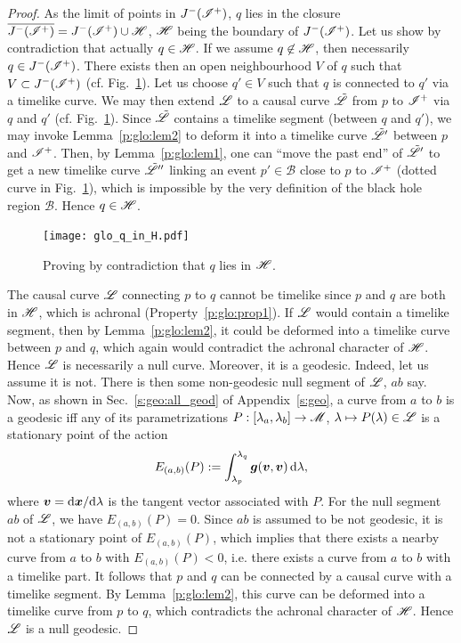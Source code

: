 \begin{proof}
As the limit of points in $J^-(\mathscr{I}^+)$, $q$ lies in the closure
$\overline{J^-(\mathscr{I}^+)} = J^-(\mathscr{I}^+) \cup \mathscr{H}$, $\mathscr{H}$
being the boundary of $J^-(\mathscr{I}^+)$.
Let us show by contradiction that actually $q\in\mathscr{H}$.
If we assume $q\not\in\mathscr{H}$, then necessarily $q\in J^-(\mathscr{I}^+)$.
There exists then an open neighbourhood $V$ of $q$ such that $V \subset  J^-(\mathscr{I}^+)$
(cf. Fig.~\ref{f:glo:q_in_H}).
Let us choose $q'\in V$ such that $q$ is connected to $q'$ via a timelike curve.
We may then extend $\mathscr{L}$ to a causal curve $\tilde{\mathscr{L}}$ from $p$ to $\mathscr{I}^+$
via $q$ and $q'$ (cf. Fig.~\ref{f:glo:q_in_H}). Since $\tilde{\mathscr{L}}$ contains a timelike segment
(between $q$ and $q'$), we may invoke Lemma~\ref{p:glo:lem2} to deform it into
a timelike curve $\tilde{\mathscr{L}}'$ between $p$ and $\mathscr{I}^+$. Then, by Lemma~\ref{p:glo:lem1},
one can ``move the past end'' of $\tilde{\mathscr{L}}'$
to get a new timelike curve $\tilde{\mathscr{L}}''$ linking an event $p'\in\mathscr{B}$ close
to $p$ to $\mathscr{I}^+$ (dotted curve in Fig.~\ref{f:glo:q_in_H}), which is impossible by the very definition of the black hole
region $\mathscr{B}$. Hence $q\in\mathscr{H}$.

\begin{figure}
\centerline{\texttt{[image: glo\_q\_in\_H.pdf]}}
\caption[]{\label{f:glo:q_in_H} \footnotesize
Proving by contradiction that $q$ lies in $\mathscr{H}$.}
\end{figure}


The causal curve $\mathscr{L}$ connecting $p$ to $q$ cannot be timelike since
$p$ and $q$ are both in $\mathscr{H}$, which is achronal (Property~\ref{p:glo:prop1}).
If $\mathscr{L}$ would contain a timelike segment, then by Lemma~\ref{p:glo:lem2}, it could
be deformed into a timelike curve between $p$ and $q$, which again would
contradict the achronal character of $\mathscr{H}$. Hence $\mathscr{L}$ is necessarily a null
curve. Moreover, it is a geodesic. Indeed, let us assume it is not.
There is then some non-geodesic null segment of $\mathscr{L}$, $ab$ say. Now, as shown in Sec.~\ref{s:geo:all_geod} of Appendix~\ref{s:geo},
a curve from $a$ to $b$ is a geodesic iff any of its parametrizations
$P: [\lambda_a,\lambda_b] \rightarrow \mathscr{M}$, $\lambda \mapsto P(\lambda)\in\mathscr{L}$
is a stationary point of the action
\[
    E_{(a,b)}(P) := \int_{\lambda_p}^{\lambda_q}
        \bm{g}(\bm{v}, \bm{v})  \, \mathrm{d}\lambda ,
\]
where $\bm{v} = \mathrm{d}\bm{x}/\mathrm{d}\lambda$ is the tangent vector
associated with $P$. For the null segment $ab$ of $\mathscr{L}$, we have
$E_{(a,b)}(P)=0$. Since $ab$ is assumed to be not geodesic, it is not a
stationary point of $E_{(a,b)}(P)$, which
implies that there exists a nearby curve from $a$ to $b$ with $E_{(a,b)}(P)<0$,
i.e. there exists a curve from $a$ to $b$ with a timelike part.
It follows that $p$ and $q$ can be connected
by a causal curve with a timelike segment. By Lemma~\ref{p:glo:lem2}, this curve can be
deformed into a timelike curve from $p$ to $q$, which contradicts
the achronal character of $\mathscr{H}$. Hence $\mathscr{L}$ is a null geodesic.


\end{proof}
